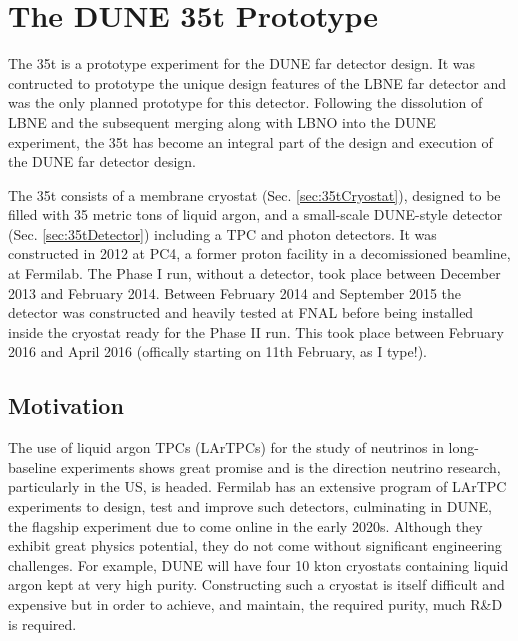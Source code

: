 
\section{The DUNE 35t Prototype}\label{sec:35t}

The 35t is a prototype experiment for the DUNE far detector design.  It was contructed to prototype the unique design features of the LBNE far detector and was the only planned prototype for this detector.  Following the dissolution of LBNE and the subsequent merging along with LBNO into the DUNE experiment, the 35t has become an integral part of the design and execution of the DUNE far detector design.

The 35t consists of a membrane cryostat (Sec. \ref{sec:35tCryostat}), designed to be filled with 35 metric tons of liquid argon, and a small-scale DUNE-style detector (Sec. \ref{sec:35tDetector}) including a TPC and photon detectors.  It was constructed in 2012 at PC4, a former proton facility in a decomissioned beamline, at Fermilab.  The Phase I run, without a detector, took place between December 2013 and February 2014.  Between February 2014 and September 2015 the detector was constructed and heavily tested at FNAL before being installed inside the cryostat ready for the Phase II run.  This took place between February 2016 and April 2016 (offically starting on 11th February, as I type!).

\subsection{Motivation}\label{sec:35tMotivation}

The use of liquid argon TPCs (LArTPCs) for the study of neutrinos in long-baseline experiments shows great promise and is the direction neutrino research, particularly in the US, is headed.  Fermilab has an extensive program of LArTPC experiments to design, test and improve such detectors, culminating in DUNE, the flagship experiment due to come online in the early 2020s.  Although they exhibit great physics potential, they do not come without significant engineering challenges.  For example, DUNE will have four 10 kton cryostats containing liquid argon kept at very high purity.  Constructing such a cryostat is itself difficult and expensive but in order to achieve, and maintain, the required purity, much R\&D is required.

